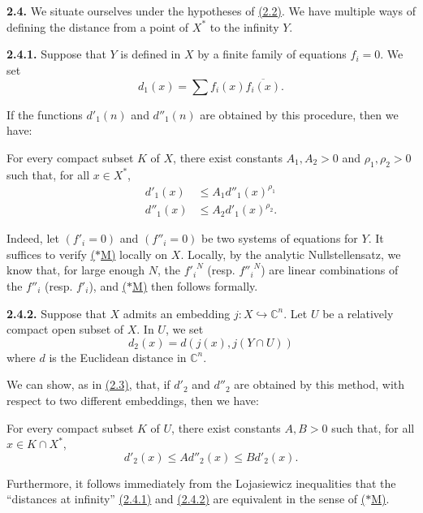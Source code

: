 \documentclass{report}
\newenvironment{itenv*}
  {\phantomsection\par\medskip\noindent\itshape}
  {\par\medskip}
\newenvironment{rmenv}[1]
  {\phantomsection\par\medskip\noindent\textbf{#1.}\rmfamily}
  {\par\medskip}
\newcommand{\CC}{\mathbb{C}}
\renewcommand{\leq}{\leqslant}
\newcommand{\oldpage}[1]{\marginpar{\footnotesize$\Big\vert$ \textit{p.~#1}}}
\begin{document}
\begin{rmenv}{2.4}
\label{II.2.4}
  We situate ourselves under the hypotheses of \hyperref[II.2.2]{(2.2)}.
  We have multiple ways of defining the distance from a point of $X^*$ to the infinity $Y$.

  \begin{rmenv}{2.4.1}
  \label{II.2.4.1}
    Suppose that $Y$ is defined in $X$ by a finite family of equations $f_i=0$.
    We set
\oldpage{62}
    \[
      d_1(x) = \sum f_i(x)\overline{f_i(x)}.
    \]

    If the functions $d'_1(n)$ and $d''_1(n)$ are obtained by this procedure, then we have:

    \begin{itenv*}
    \label{II.2.4.1.*M}
      For every compact subset $K$ of $X$, there exist constants $A_1,A_2>0$ and $\rho_1,\rho_2>0$ such that, for all $x\in X^*$,
      \[
        \begin{aligned}
          d'_1(x) &\leq A_1d''_1(x)^{\rho_1}
        \\d''_1(x) &\leq A_2d'_1(x)^{\rho_2}.
        \end{aligned}
      \tag{$*$M}
      \]
    \end{itenv*}

    Indeed, let $(f'_i=0)$ and $(f''_i=0)$ be two systems of equations for $Y$.
    It suffices to verify \hyperref[II.2.4.1.*M]{($*$M)} locally on $X$.
    Locally, by the analytic Nullstellensatz, we know that, for large enough $N$, the ${f'_i}^N$ (resp. ${f''_i}^N$) are linear combinations of the $f''_i$ (resp. $f'_i$), and \hyperref[II.2.4.1.*M]{($*$M)} then follows formally.
  \end{rmenv}

  \begin{rmenv}{2.4.2}
  \label{II.2.4.2}
    Suppose that $X$ admits an embedding $j\colon X\hookrightarrow\CC^n$.
    Let $U$ be a relatively compact open subset of $X$.
    In $U$, we set
    \[
      d_2(x) = d(j(x),j(Y\cap U))
    \]
    where $d$ is the Euclidean distance in $\CC^n$.

    We can show, as in \hyperref[II.2.3]{(2.3)}, that, if $d'_2$ and $d''_2$ are obtained by this method, with respect to two different embeddings, then we have:

    \begin{itenv*}
    \label{II.2.4.2.*R}
      For every compact subset $K$ of $U$, there exist constants $A,B>0$ such that, for all $x\in K\cap X^*$,
      \[
        d'_2(x) \leq Ad''_2(x) \leq Bd'_2(x).
      \tag{$*$R}
      \]
    \end{itenv*}

    Furthermore, it follows immediately from the Lojasiewicz inequalities \cite[Th.~1, p.~85]{18} that the ``distances at infinity'' \hyperref[II.2.4.1]{(2.4.1)} and \hyperref[II.2.4.2]{(2.4.2)} are equivalent in the sense of \hyperref[II.2.4.1.*M]{($*$M)}.
  \end{rmenv}
\end{rmenv}
\end{document}
